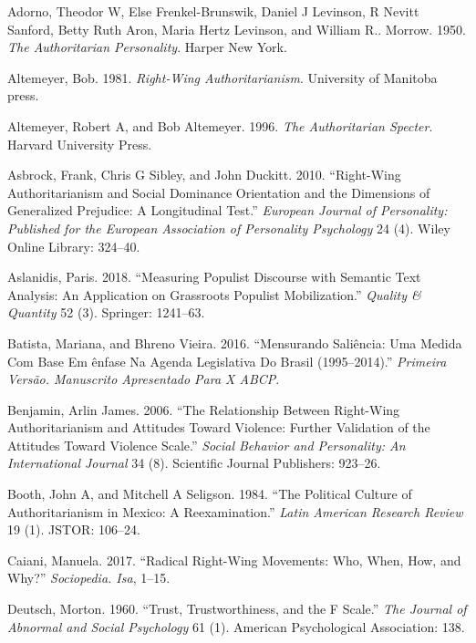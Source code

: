 \documentclass[12 pt,]{article}
\begin{document}
\hypertarget{refs}{}
\leavevmode\hypertarget{ref-adorno1950authoritarian}{}%
Adorno, Theodor W, Else Frenkel-Brunswik, Daniel J Levinson, R Nevitt
Sanford, Betty Ruth Aron, Maria Hertz Levinson, and William R.. Morrow.
1950. \emph{The Authoritarian Personality}. Harper New York.

\leavevmode\hypertarget{ref-altemeyer1981right}{}%
Altemeyer, Bob. 1981. \emph{Right-Wing Authoritarianism}. University of
Manitoba press.

\leavevmode\hypertarget{ref-altemeyer1996authoritarian}{}%
Altemeyer, Robert A, and Bob Altemeyer. 1996. \emph{The Authoritarian
Specter}. Harvard University Press.

\leavevmode\hypertarget{ref-asbrock2010right}{}%
Asbrock, Frank, Chris G Sibley, and John Duckitt. 2010. ``Right-Wing
Authoritarianism and Social Dominance Orientation and the Dimensions of
Generalized Prejudice: A Longitudinal Test.'' \emph{European Journal of
Personality: Published for the European Association of Personality
Psychology} 24 (4). Wiley Online Library: 324--40.

\leavevmode\hypertarget{ref-aslanidis2018measuring}{}%
Aslanidis, Paris. 2018. ``Measuring Populist Discourse with Semantic
Text Analysis: An Application on Grassroots Populist Mobilization.''
\emph{Quality \& Quantity} 52 (3). Springer: 1241--63.

\leavevmode\hypertarget{ref-batista2016mensurando}{}%
Batista, Mariana, and Bhreno Vieira. 2016. ``Mensurando Saliência: Uma
Medida Com Base Em ênfase Na Agenda Legislativa Do Brasil
(1995--2014).'' \emph{Primeira Versão. Manuscrito Apresentado Para X
ABCP}.

\leavevmode\hypertarget{ref-benjamin2006relationship}{}%
Benjamin, Arlin James. 2006. ``The Relationship Between Right-Wing
Authoritarianism and Attitudes Toward Violence: Further Validation of
the Attitudes Toward Violence Scale.'' \emph{Social Behavior and
Personality: An International Journal} 34 (8). Scientific Journal
Publishers: 923--26.

\leavevmode\hypertarget{ref-booth1984political}{}%
Booth, John A, and Mitchell A Seligson. 1984. ``The Political Culture of
Authoritarianism in Mexico: A Reexamination.'' \emph{Latin American
Research Review} 19 (1). JSTOR: 106--24.

\leavevmode\hypertarget{ref-caiani2017radical}{}%
Caiani, Manuela. 2017. ``Radical Right-Wing Movements: Who, When, How,
and Why?'' \emph{Sociopedia. Isa}, 1--15.

\leavevmode\hypertarget{ref-deutsch1960trust}{}%
Deutsch, Morton. 1960. ``Trust, Trustworthiness, and the F Scale.''
\emph{The Journal of Abnormal and Social Psychology} 61 (1). American
Psychological Association: 138.
\end{document}
